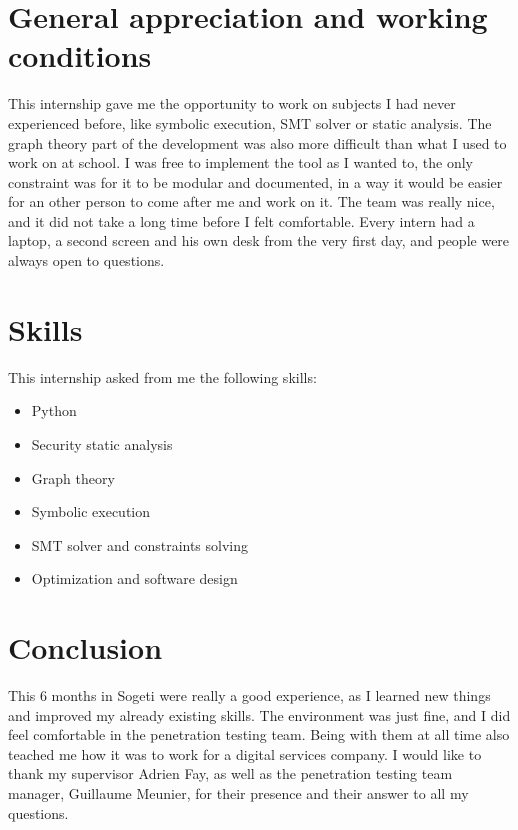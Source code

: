 \documentclass[a4paper, 12pt]{report}
\begin{document}
\section*{General appreciation and working conditions}
This internship gave me the opportunity to work on subjects I had never experienced before, like symbolic execution, SMT solver or static analysis. The graph theory part of the development was also more difficult than what I used to work on at school.
I was free to implement the tool as I wanted to, the only constraint was for it to be modular and documented, in a way it would be easier for an other person to come after me and work on it.
The team was really nice, and it did not take a long time before I felt comfortable. Every intern had a laptop, a second screen and his own desk from the very first day, and people were always open to questions.
\section*{Skills}
This internship asked from me the following skills:
\begin{itemize}
        \item Python
        \item Security static analysis
        \item Graph theory
        \item Symbolic execution
        \item SMT solver and constraints solving
        \item Optimization and software design
\end{itemize}
\section*{Conclusion}
This 6 months in Sogeti were really a good experience, as I learned new things and improved my already existing skills. The environment was just fine, and I did feel comfortable in the penetration testing team. Being with them at all time also teached me how it was to work for a digital services company.
I would like to thank my supervisor Adrien Fay, as well as the penetration testing team manager, Guillaume Meunier, for their presence and their answer to all my questions.
\end{document}
